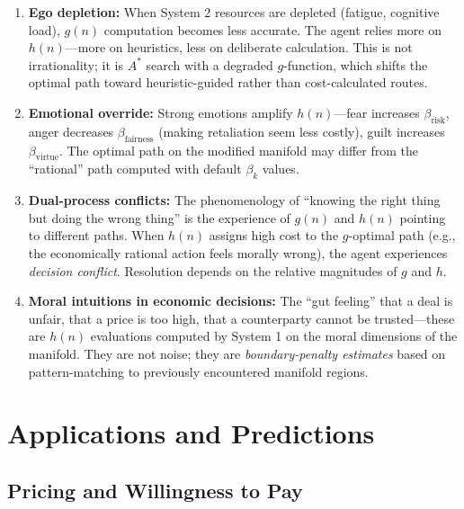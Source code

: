\documentclass[12pt]{article}
\theoremstyle{definition}
\theoremstyle{remark}
\begin{document}
\begin{enumerate}
    \item \textbf{Ego depletion:} When System 2 resources are depleted (fatigue, cognitive load), $g(n)$ computation becomes less accurate.  The agent relies more on $h(n)$---more on heuristics, less on deliberate calculation.  This is not irrationality; it is $A^*$ search with a degraded $g$-function, which shifts the optimal path toward heuristic-guided rather than cost-calculated routes.

    \item \textbf{Emotional override:} Strong emotions amplify $h(n)$---fear increases $\beta_{\text{risk}}$, anger decreases $\beta_{\text{fairness}}$ (making retaliation seem less costly), guilt increases $\beta_{\text{virtue}}$.  The optimal path on the modified manifold may differ from the ``rational'' path computed with default $\beta_k$ values.

    \item \textbf{Dual-process conflicts:} The phenomenology of ``knowing the right thing but doing the wrong thing'' is the experience of $g(n)$ and $h(n)$ pointing to different paths.  When $h(n)$ assigns high cost to the $g$-optimal path (e.g., the economically rational action feels morally wrong), the agent experiences \emph{decision conflict}.  Resolution depends on the relative magnitudes of $g$ and $h$.

    \item \textbf{Moral intuitions in economic decisions:} The ``gut feeling'' that a deal is unfair, that a price is too high, that a counterparty cannot be trusted---these are $h(n)$ evaluations computed by System 1 on the moral dimensions of the manifold.  They are not noise; they are \emph{boundary-penalty estimates} based on pattern-matching to previously encountered manifold regions.
\end{enumerate}


\section{Applications and Predictions}
\label{sec:applications}

\subsection{Pricing and Willingness to Pay}
\end{document}
